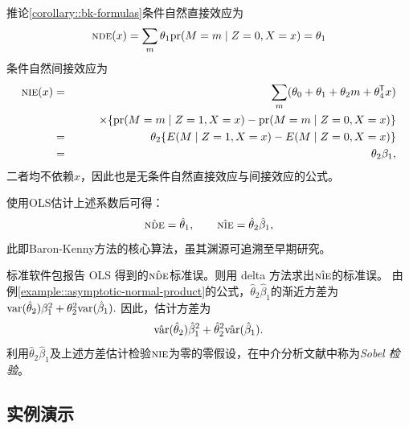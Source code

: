 \begin{myproof}{推论}{\ref{corollary::bk-formulas}}条件自然直接效应为
$$
\textsc{nde}(x)  
= \sum_m  \theta_1  \textup{pr}(M=m \mid Z=0, X=x) = \theta_1
$$
条件自然间接效应为
\begin{eqnarray*}
\textsc{nie}(x) &=&  \sum_m  (\theta_0 + \theta_1  + \theta_2 m + \theta_4^{\mkern-1.5mu\mathsf{T}} x )\\
&&  \qquad  \times  \{ \textup{pr}(M=m \mid Z=1, X=x) -  \textup{pr}(M=m \mid Z=0, X=x) \} \\
&=& \theta_2 \{ E(M \mid Z=1, X=x) -  E(M \mid Z=0, X=x) \} \\
&=&  \theta_2 \beta_1 ,
\end{eqnarray*}
二者均不依赖$x$，因此也是无条件自然直接效应与间接效应的公式。
\end{myproof}


 
使用OLS估计上述系数后可得：
$$
\hat{\textsc{nde}} = \hat{\theta}_1,\qquad
\hat{\textsc{nie}} = \hat{\theta}_2 \hat{\beta}_1,
$$
此即Baron-Kenny方法\citep{Judd::1981, baron1986moderator}的核心算法，虽其渊源可追溯至早期研究\citep[e.g.,][]{hyman1955survey, alwin1975decomposition, Judd::1981, sobel1982asymptotic}。


标准软件包报告 OLS 得到的$\hat{\textsc{nde}}$标准误。\citet{sobel1982asymptotic, sobel1986some}则用 delta 方法求出$\hat{\textsc{nie}}$的标准误。 
由例\ref{example::asymptotic-normal-product}的公式，$\hat{\theta}_2  \hat{\beta}_1 $的渐近方差为
$
\textup{var}(\hat{\theta}_2)  \beta_1^2 + \theta_2^2 \textup{var}(\hat{\beta}_1) .
$
因此，估计方差为
$$
\hat{\textup{var}}(\hat{\theta}_2)  \hat{\beta}_1^2 + \hat{\theta}_2^2 \hat{\textup{var}}(\hat{\beta}_1) .
$$
利用$\hat{\theta}_2 \hat{\beta}_1$及上述方差估计检验$\textsc{nie}$为零的零假设，在中介分析文献中称为{\it Sobel 检验}。 


 


\subsection{实例演示}\label{section::BK-jobs}

